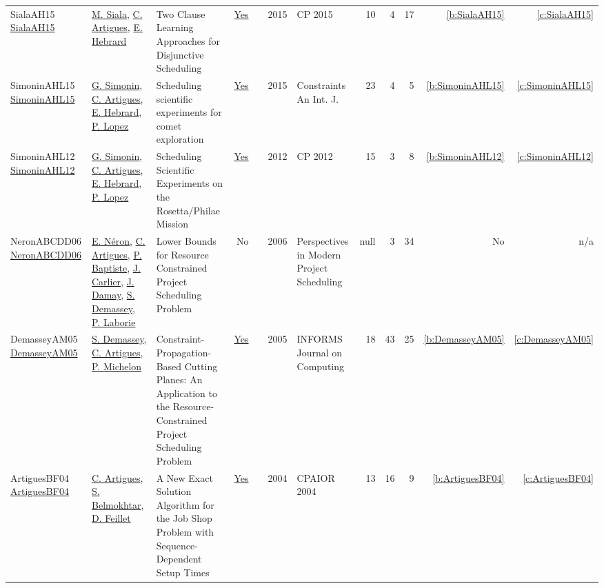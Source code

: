 {\begin{longtable}{>{\raggedright\arraybackslash}p{3cm}>{\raggedright\arraybackslash}p{6cm}>{\raggedright\arraybackslash}p{6.5cm}rrrp{2.5cm}rrrrr}
SialaAH15 \href{https://doi.org/10.1007/978-3-319-23219-5\_28}{SialaAH15} & \hyperref[auth:a130]{M. Siala}, \hyperref[auth:a6]{C. Artigues}, \hyperref[auth:a1]{E. Hebrard} & Two Clause Learning Approaches for Disjunctive Scheduling & \href{works/SialaAH15.pdf}{Yes} & \cite{SialaAH15} & 2015 & CP 2015 & 10 & 4 & 17 & \ref{b:SialaAH15} & \ref{c:SialaAH15}\\
SimoninAHL15 \href{https://doi.org/10.1007/s10601-014-9169-3}{SimoninAHL15} & \hyperref[auth:a127]{G. Simonin}, \hyperref[auth:a6]{C. Artigues}, \hyperref[auth:a1]{E. Hebrard}, \hyperref[auth:a3]{P. Lopez} & Scheduling scientific experiments for comet exploration & \href{works/SimoninAHL15.pdf}{Yes} & \cite{SimoninAHL15} & 2015 & Constraints An Int. J. & 23 & 4 & 5 & \ref{b:SimoninAHL15} & \ref{c:SimoninAHL15}\\
SimoninAHL12 \href{https://doi.org/10.1007/978-3-642-33558-7\_5}{SimoninAHL12} & \hyperref[auth:a127]{G. Simonin}, \hyperref[auth:a6]{C. Artigues}, \hyperref[auth:a1]{E. Hebrard}, \hyperref[auth:a3]{P. Lopez} & Scheduling Scientific Experiments on the Rosetta/Philae Mission & \href{works/SimoninAHL12.pdf}{Yes} & \cite{SimoninAHL12} & 2012 & CP 2012 & 15 & 3 & 8 & \ref{b:SimoninAHL12} & \ref{c:SimoninAHL12}\\
NeronABCDD06 \href{http://dx.doi.org/10.1007/978-0-387-33768-5_7}{NeronABCDD06} & \hyperref[auth:a917]{E. Néron}, \hyperref[auth:a6]{C. Artigues}, \hyperref[auth:a164]{P. Baptiste}, \hyperref[auth:a858]{J. Carlier}, \hyperref[auth:a918]{J. Damay}, \hyperref[auth:a246]{S. Demassey}, \hyperref[auth:a118]{P. Laborie} & Lower Bounds for Resource Constrained Project Scheduling Problem & No & \cite{NeronABCDD06} & 2006 & Perspectives in Modern Project Scheduling & null & 3 & 34 & No & n/a\\
DemasseyAM05 \href{http://dx.doi.org/10.1287/ijoc.1030.0043}{DemasseyAM05} & \hyperref[auth:a246]{S. Demassey}, \hyperref[auth:a6]{C. Artigues}, \hyperref[auth:a361]{P. Michelon} & Constraint-Propagation-Based Cutting Planes: An Application to the Resource-Constrained Project Scheduling Problem & \href{works/DemasseyAM05.pdf}{Yes} & \cite{DemasseyAM05} & 2005 & INFORMS Journal on Computing & 18 & 43 & 25 & \ref{b:DemasseyAM05} & \ref{c:DemasseyAM05}\\
ArtiguesBF04 \href{https://doi.org/10.1007/978-3-540-24664-0\_3}{ArtiguesBF04} & \hyperref[auth:a6]{C. Artigues}, \hyperref[auth:a389]{S. Belmokhtar}, \hyperref[auth:a362]{D. Feillet} & A New Exact Solution Algorithm for the Job Shop Problem with Sequence-Dependent Setup Times & \href{works/ArtiguesBF04.pdf}{Yes} & \cite{ArtiguesBF04} & 2004 & CPAIOR 2004 & 13 & 16 & 9 & \ref{b:ArtiguesBF04} & \ref{c:ArtiguesBF04}\\

\end{longtable}}
